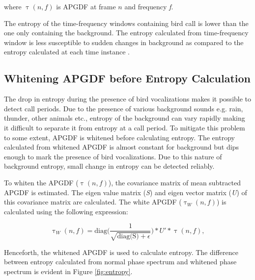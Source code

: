 \documentclass[a4paper]{article}
\begin{document}
where $\uptau(n,f)$ is APGDF at frame $n$ and frequency  \textit{f}.

The entropy of the time-frequency windows containing bird call is lower than the one only containing the background. The entropy calculated from time-frequency window is less susceptible to sudden changes in background as compared to the entropy calculated at each time instance \cite{wang2013}.




 


\subsection{Whitening APGDF before Entropy Calculation}

The drop in entropy during the presence of bird vocalizations makes it possible to detect call periods. Due to the presence of various background sounds e.g. rain, thunder, other animals etc., entropy of the background can  vary rapidly making it difficult to separate it from entropy  at a call period. To mitigate this problem to some extent, APGDF is whitened  before calculating entropy. The entropy calculated from whitened APGDF  is almost constant for background but dips enough to mark the presence of bird vocalizations. Due to this nature of background entropy, small change in entropy can be detected reliably.

To whiten the APGDF ($\uptau(n,f)$), the covariance matrix of mean subtracted APGDF is estimated. The eigen value matrix (\textit{S}) and eigen vector matrix (\textit{U}) of this covariance matrix are calculated. The white APGDF  ($\uptau_W(n,f)$) is calculated using the following expression:

\begin{equation}
\uptau_W(n,f)=\text{diag} \bigg(  \frac{1}{\sqrt{\text{diag(S)}+\epsilon}} \bigg )*U'*\uptau(n,f),
\end{equation}




Henceforth, the whitened APGDF is used to calculate entropy. The difference between entropy calculated from normal phase spectrum and whitened phase spectrum is evident in Figure \ref{fig:entropy}.
\end{document}
